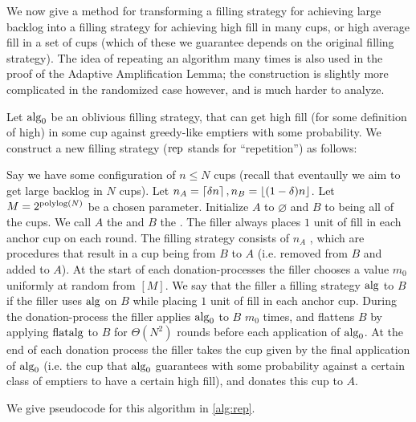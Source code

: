 We now give a method for transforming a filling strategy for achieving
large backlog into a filling strategy for achieving high fill in
many cups, or high average fill in a set of cups (which of these
we guarantee depends on the original filling strategy). The idea
of repeating an algorithm many times is also used in the proof of
the Adaptive Amplification Lemma; the construction is slightly more
complicated in the randomized case however, and is much harder to
analyze.

\begin{definition}
  \label{def:rep}
  {\normalfont
  Let $\operatorname{\text{\textup{alg}}}_0$ be an oblivious filling strategy, that can get
  high fill (for some definition of high) in some cup against
  greedy-like emptiers with some probability. We construct a new
  filling strategy  ($\operatorname{\text{\textup{rep}}}$ stands
  for \enquote{repetition}) as follows:

  Say we have some configuration of $n\le N$ cups (recall that
  eventaully we aim to get large backlog in $N$ cups).
  Let $n_A = \left\lceil \delta n \right\rceil, n_B = \left\lfloor (1-\delta)n \right\rfloor$. Let
  $M=2^{\operatorname{\text{polylog}}(N)}$ be a chosen parameter. 
  Initialize $A$ to $\varnothing$ and $B$ to
  being all of the cups. We call $A$ the  and
  $B$ the . The filler always places $1$
  unit of fill in each anchor cup on each round. The filling
  strategy consists of $n_A$ , which are
  procedures that result in a cup being  from $B$
  to $A$ (i.e. removed from $B$ and added to $A$). At the start
  of each donation-processes the filler chooses a value $m_0$
  uniformly at random from $[M]$. We say that the filler
   a filling strategy $\operatorname{\text{\textup{alg}}}$ to $B$ if the
  filler uses $\operatorname{\text{\textup{alg}}}$ on $B$ while placing $1$ unit of fill
  in each anchor cup. During the donation-process the filler
  applies $\operatorname{\text{\textup{alg}}}_0$ to $B$ $m_0$ times, and flattens $B$ by
  applying $\operatorname{\text{\textup{flatalg}}}$ to $B$ for $\Theta(N^2)$ rounds before each
  application of $\operatorname{\text{\textup{alg}}}_0$. At the end of each donation process
  the filler takes the cup given by the final application of
  $\operatorname{\text{\textup{alg}}}_0$ (i.e. the cup that $\operatorname{\text{\textup{alg}}}_0$ guarantees with some
  probability against a certain class of emptiers to have a
  certain high fill), and donates this cup to $A$. 

  We give pseudocode for this algorithm in \cref{alg:rep}.
 }


\end{definition}
